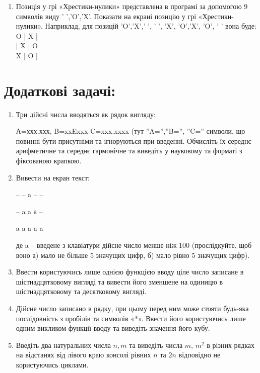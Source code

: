 \documentclass[a5paper,titlepage,openany,twoside,
]
{book_unv}%
\begin{document}
\begin{enumerate}
\item
Позиція у грі «Хрестики-нулики» представлена в програмі за допомогою 9 символів виду ' ','O','X'.
Показати на екрані позицію у грі «Хрестики-нулики».
Наприклад, для позицій 'O','X',' ', ' ', 'X', 'O','X', 'O', ' ' вона буде:\\
O | X | \hspace*{7pt} \\
\hspace*{7pt} | X | O \\
X | O | \hspace*{7pt} \\

\end{enumerate}

\section{Додаткові задачі:}

\begin{enumerate}
\def\labelenumi{\arabic{enumi}.}
\setcounter{enumi}{19}
\item
Три дійсні числа вводяться як рядок вигляду:

А=ххх.ххх, B=xxExxx C=xxx.xxxx (тут ''A='',''B='', ''C='' символи, що
повинні бути присутніми та ігноруються при введенні. Обчисліть їх
середнє арифметичне та середнє гармонічне та виведіть у науковому та
форматі з фіксованою крапкою.

\item
Вивести на екран текст:

-- \textbar{} -- \textbar{} a \textbar{} -- \textbar{} --

-- \textbar{} a \textbar{} a \textbar{} а \textbar{} --

a \textbar{} a \textbar{} a \textbar{} a \textbar{} a

де a -- введене з клавіатури дійсне число менше ніж 100 (прослідкуйте, щоб
воно а) мало не більше 5 значущих цифр, б) мало рівно 5 значущих цифр).

\item
Ввести користуючись лише однією функцією вводу ціле число записане в шістнадцятковому вигляді та вивести його зменшене на одиницю в шістнадцятковому та десятковому вигляді.

\item
Дійсне число записано в рядку, при цьому перед ним може стояти будь-яка послідовність з пробілів та символів «*». Ввести його користуючись лише одним викликом функції вводу та виведіть значення його кубу.

\item
Введіть два натуральних числа $n, m$ та виведіть числа $m$, $m^{2}$ в різних рядках
на відстанях від лівого краю консолі рівних $n$ та $2n$ відповідно не користуючись циклами.

\end{enumerate}
\end{document}
